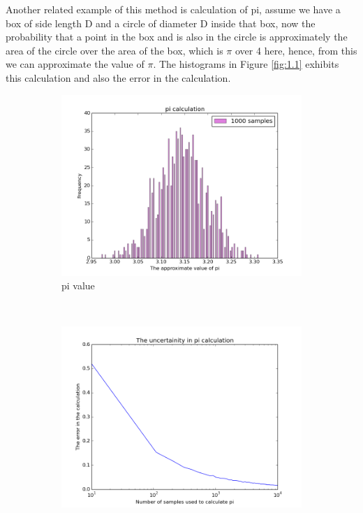 Another related example of this method is calculation of pi, assume we have a box of side length D and a circle of diameter D inside that box, now the probability that a point in the box and is also in the circle is approximately the area of the circle over the area of the box, which is $\pi$ over 4 here, hence, from this we can approximate the value of $\pi$. The histograms in Figure \ref{fig:1.1} exhibits this calculation and also the error in the calculation\citep{Weinzierl}.


\begin{figure}
    \centering
    \begin{subfigure}[b]{0.5\textwidth}
        \includegraphics[scale=.5]{images/pi_value.png} 
        \caption{pi value}
        \label{fig:gull}
    \end{subfigure}
    ~ %
    \begin{subfigure}[b]{0.5\textwidth}
        \includegraphics[scale=0.5]{images/uncertainity_pi.png}

\end{subfigure}
\end{figure}
